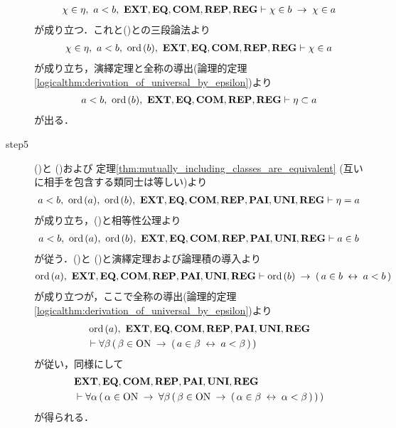 \begin{prf}
\begin{description}
				\begin{align}
					\chi \in \eta,\ a < b,\ \EXTAX,\EQAX,\COMAX,\REPAX,\REGAX \vdash \chi \in b \rarrow \chi \in a
				\end{align}
				が成り立つ．これと()との三段論法より
				\begin{align}
					\chi \in \eta,\ a < b,\ \ord{b},\ \EXTAX,\EQAX,\COMAX,\REPAX,\REGAX \vdash \chi \in a
				\end{align}
				が成り立ち，演繹定理と全称の導出(論理的定理\ref{logicalthm:derivation_of_universal_by_epsilon})より
				\begin{align}
					a < b,\ \ord{b},\ \EXTAX,\EQAX,\COMAX,\REPAX,\REGAX \vdash \eta \subset a
					\label{fom:element_and_proper_subset_correspond_19}
				\end{align}
				が出る．
			
			\item[step5] ()と
				()および
				定理\ref{thm:mutually_including_classes_are_equivalent} (互いに相手を包含する類同士は等しい)より
				\begin{align}
					a < b,\ \ord{a},\ \ord{b},\ \EXTAX,\EQAX,\COMAX,\REPAX,\PAIAX,\UNIAX,\REGAX \vdash \eta = a
				\end{align}
				が成り立ち，()と相等性公理より
				\begin{align}
					a < b,\ \ord{a},\ \ord{b},\ \EXTAX,\EQAX,\COMAX,\REPAX,\PAIAX,\UNIAX,\REGAX \vdash a \in b
					\label{fom:element_and_proper_subset_correspond_20}
				\end{align}
				が従う．()と
				()と演繹定理および論理積の導入より
				\begin{align}
					\ord{a},\ \EXTAX,\EQAX,\COMAX,\REPAX,\PAIAX,\UNIAX,\REGAX \vdash 
					\ord{b} \rarrow (\, a \in b \lrarrow a < b\, )
				\end{align}
				が成り立つが，ここで全称の導出(論理的定理\ref{logicalthm:derivation_of_universal_by_epsilon})より
				\begin{align}
					&\ord{a},\ \EXTAX,\EQAX,\COMAX,\REPAX,\PAIAX,\UNIAX,\REGAX \\
					&\vdash \forall \beta\, (\, \beta \in \ON \rarrow (\, a \in \beta \lrarrow a < \beta\, )\, )
				\end{align}
				が従い，同様にして
				\begin{align}
					&\mbox{{\bf EXT}},\mbox{{\bf EQ}},\mbox{\bf COM},\mbox{{\bf REP}},\mbox{{\bf PAI}},\mbox{{\bf UNI}},\mbox{{\bf REG}} \\
					&\vdash \forall \alpha\, (\, \alpha \in \mathrm{ON} \hspace{0.25em}\rightarrow\hspace{0.25em}
					\forall \beta\, (\, \beta \in \mathrm{ON} \hspace{0.25em}\rightarrow\hspace{0.25em} (\, \alpha \in \beta \hspace{0.25em}\leftrightarrow\hspace{0.25em} \alpha < \beta\, )\, )\, )
				\end{align}
				が得られる．
				\QED
		\end{description}
	\end{prf}
	
